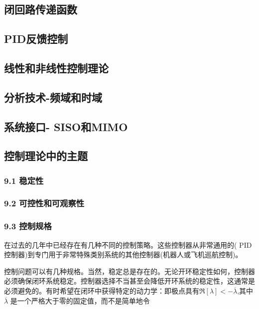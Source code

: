 \subsection{闭回路传递函数}



\subsection{PID反馈控制}



\subsection{线性和非线性控制理论}



\subsection{分析技术-频域和时域}



\subsection{系统接口- SISO和MIMO}



\subsection{控制理论中的主题}

\subsubsection{9.1 稳定性}



\subsubsection{9.2 可控性和可观察性}



\subsubsection{9.3 控制规格}

在过去的几年中已经存在有几种不同的控制策略。这些控制器从非常通用的( PID控制器)到专门用于非常特殊类别系统的其他控制器(机器人或飞机巡航控制)。

控制问题可以有几种规格。当然，稳定总是存在的。无论开环稳定性如何，控制器必须确保闭环系统稳定。控制器选择不当甚至会降低开环系统的稳定性，这通常是必须避免的。有时希望在闭环中获得特定的动力学：即极点具有$\Re[\lambda] < -\overline{\lambda}$,其中$\overline{\lambda}$ 是一个严格大于零的固定值，而不是简单地令


